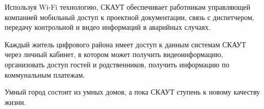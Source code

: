 Используя Wi-Fi технологию, СКАУТ обеспечивает работникам управляющей компанией мобильный доступ к проектной документации, связь с диспетчером, передачу контрольной и видео информаций в аварийных случаях. 

Каждый житель цифрового района имеет доступ к данным системам СКАУТ через личный кабинет, в котором может получить видеоинформацию, организовать доступ гостей и родственников, получить информацию по коммунальным платежам. 

Умный город состоит из умных домов, а пока СКАУТ ступень к новому качеству жизни.
